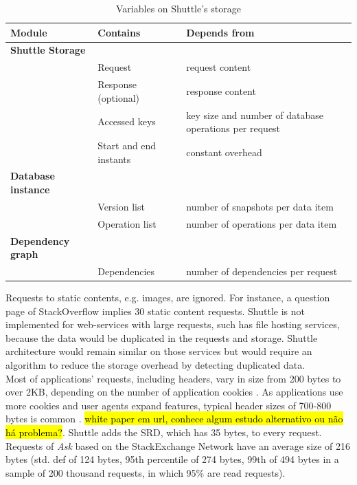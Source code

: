 \begin{table}[ht]
\centering
\begin{tabular}{l|ll}
\textbf{Module}          & \textbf{Contains}      & \textbf{Depends from}    \\ \hline
\textbf{Shuttle Storage} &                        &                          \\
                         & Request                & request content          \\
                         & Response (optional)    & response content         \\
                         & Accessed keys          & key size and number of database operations per request\\
                         & Start and end instants & constant overhead           \\ \hline
\textbf{Database instance} &                      &                          \\
                          & Version list          & number of snapshots per data item \\
                          & Operation list        & number of operations per data item \\ \hline
\textbf{Dependency graph} &                       &                                   \\
                        & Dependencies            & number of dependencies per request\\
\end{tabular}
\caption{Variables on Shuttle's storage}
\label{tab:storage_variables}
\end{table}

Requests to static contents, e.g. images, are ignored. For instance, a question page of StackOverflow \cite{stackoverflow} implies 30 static content requests. Shuttle is not implemented for web-services with large requests, such has file hosting services, because the data would be duplicated in the requests and storage. Shuttle architecture would remain similar on those services but would require an algorithm to reduce the storage overhead by detecting duplicated data.\\

Most of applications' requests, including headers, vary in size from 200 bytes to over 2KB, depending on the number of application cookies \cite{spdy}. As applications use more cookies and user agents expand features, typical header sizes of 700-800 bytes is common \cite{spdy}. \hl{white paper em url, conhece algum estudo alternativo ou não há problema?}. Shuttle adds the \ac{SRD}, which has 35 bytes, to every request. Requests of \emph{Ask} based on the StackExchange Network have an average size of 216 bytes (std. def of 124 bytes, 95th percentile of 274 bytes,  99th of 494 bytes in a sample of 200 thousand requests, in which 95\% are read requests).

